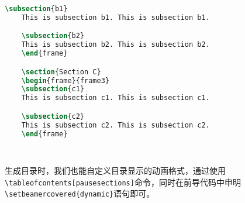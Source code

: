 \begin{lstlisting}[language=TeX]
    \subsection{b1}
    This is subsection b1. This is subsection b1.

    \subsection{b2}
    This is subsection b2. This is subsection b2.
    \end{frame}

    \section{Section C}
    \begin{frame}{frame3}
    \subsection{c1}
    This is subsection c1. This is subsection c1.

    \subsection{c2}
    This is subsection c2. This is subsection c2.
    \end{frame}

    
\end{lstlisting}

生成目录时，我们也能自定义目录显示的动画格式，通过使用\texttt{\textbackslash{}tableofcontents[pausesections]}命令，同时在前导代码中申明\texttt{\textbackslash{}setbeamercovered\{dynamic\}}语句即可。

